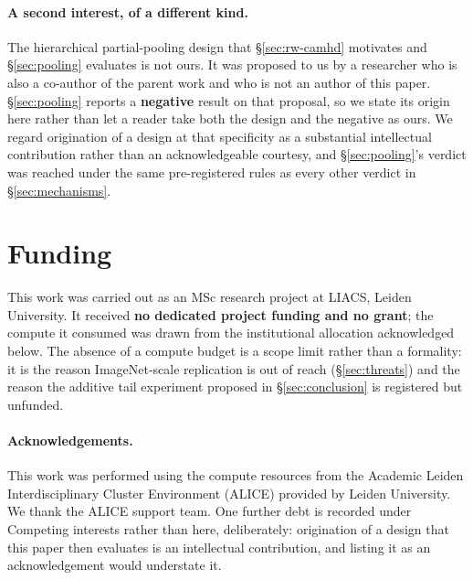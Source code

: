 \documentclass[10pt,letterpaper]{article}
\begin{document}
\paragraph{A second interest, of a different kind.}
The hierarchical partial-pooling design that \S\ref{sec:rw-camhd} motivates and
\S\ref{sec:pooling} evaluates is not ours. It was proposed to us by a researcher who is also a
co-author of the parent work and who is not an author of this paper. \S\ref{sec:pooling} reports a
\textbf{negative} result on that proposal, so we state its origin here rather than let a reader
take both the design and the negative as ours. We regard origination of a design at that
specificity as a substantial intellectual contribution rather than an acknowledgeable courtesy, and
\S\ref{sec:pooling}'s verdict was reached under the same pre-registered rules as every other
verdict in \S\ref{sec:mechanisms}.

\section*{Funding}
This work was carried out as an MSc research project at LIACS, Leiden University. It received
\textbf{no dedicated project funding and no grant}; the compute it consumed was drawn from the
institutional allocation acknowledged below. The absence of a
compute budget is a scope limit rather than a formality: it is the reason ImageNet-scale
replication is out of reach (\S\ref{sec:threats}) and the reason the additive tail experiment
proposed in \S\ref{sec:conclusion} is registered but unfunded.

\paragraph{Acknowledgements.}
This work was performed using the compute resources from the Academic Leiden Interdisciplinary
Cluster Environment (ALICE) provided by Leiden University. We thank the ALICE support team. One
further debt is recorded under Competing interests rather than here, deliberately: origination of a
design that this paper then evaluates is an intellectual contribution, and listing it as an
acknowledgement would understate it.
\end{document}
